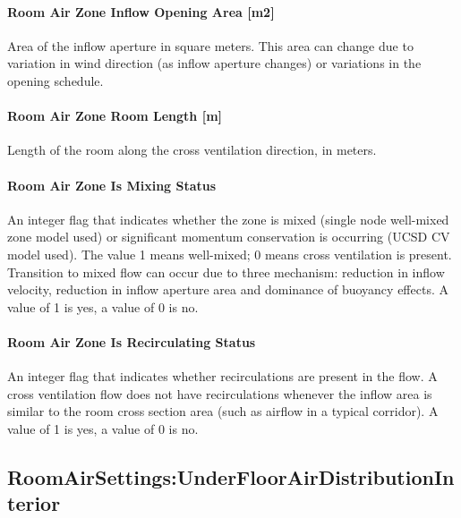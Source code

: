 \paragraph{Room Air Zone Inflow Opening Area {[}m2{]}}\label{room-air-zone-inflow-opening-area-m2}

Area of the inflow aperture in square meters. This area can change due to variation in wind direction (as inflow aperture changes) or variations in the opening schedule.

\paragraph{Room Air Zone Room Length {[}m{]}}\label{room-air-zone-room-length-m}

Length of the room along the cross ventilation direction, in meters.

\paragraph{\texorpdfstring{Room Air Zone Is Mixing Status \protect\hyperlink{section-1}{}}{Room Air Zone Is Mixing Status }}\label{room-air-zone-is-mixing-status}

An integer flag that indicates whether the zone is mixed (single node well-mixed zone model used) or significant momentum conservation is occurring (UCSD CV model used). The value 1 means well-mixed; 0 means cross ventilation is present. Transition to mixed flow can occur due to three mechanism: reduction in inflow velocity, reduction in inflow aperture area and dominance of buoyancy effects. A value of 1 is yes, a value of 0 is no.

\paragraph{\texorpdfstring{Room Air Zone Is Recirculating Status \protect\hyperlink{section-1}{}}{Room Air Zone Is Recirculating Status }}\label{room-air-zone-is-recirculating-status}

An integer flag that indicates whether recirculations are present in the flow. A cross ventilation flow does not have recirculations whenever the inflow area is similar to the room cross section area (such as airflow in a typical corridor). A value of 1 is yes, a value of 0 is no.

\subsection{RoomAirSettings:UnderFloorAirDistributionInterior}\label{roomairsettingsunderfloorairdistributioninterior}

